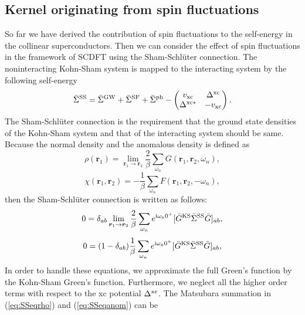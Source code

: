 \subsection{Kernel originating from spin fluctuations}
So far we have derived the contribution of spin fluctuations to the self-energy in the collinear superconductors.
Then we can consider the effect of spin fluctuations in the framework of SCDFT using the Sham-Schl\"{u}ter connection\cite{Sham1983,MarquesphD}.
The noninteracting Kohn-Sham system is mapped to the interacting system by the following self-energy
%
\begin{equation}
	\bar{\Sigma}^{\rm SS} = \bar{\Sigma}^{\rm GW} + \bar{\Sigma}^{\rm SF} + \bar{\Sigma}^{\rm ph}
	- 
	\begin{pmatrix}
		v_{\rm xc}  &   \Delta^{\rm xc}   \\
		\Delta^{\rm xc\ast}  &  -v_{\rm xc}
	\end{pmatrix}.
	\label{eq:SSself-energy}
\end{equation}
The Sham-Schl\"{u}ter connection is the requirement that the ground state densities of the Kohn-Sham
system and that of the interacting system should be same.
Because the normal density and the anomalous density is defined as 
%
\begin{equation}
	\rho(\bm r_1) = \lim_{\bm r_1 \to \bm r_2}
	\frac{2}{\beta}\sum_{\omega_n}G(\bm r_1,\bm r_2,\omega_n),
	\label{eq:normaldensity}
\end{equation}
%
\begin{equation}
	\chi(\bm r_1, \bm r_2) = - \frac{1}{\beta}\sum_{\omega_n}F(\bm r_1, \bm r_2, -\omega_n),
	\label{eq:anomdensity}
\end{equation}
%
then the Sham-Schl\"{u}ter connection is written as follows:
%
\begin{equation}
	0 = \delta_{ab}\lim_{\bm r_1 \to \bm r_2} \frac{2}{\beta} 
	\sum_{\omega_n}e^{\rm i\omega_n0^{+}}[\bar{G}^{\rm KS}\bar{\Sigma}^{\rm SS}\bar{G}]_{ab},
	\label{eq:SSeqrho}
\end{equation}
%
\begin{equation}
	0 = (1-\delta_{ab})\frac{1}{\beta}\sum_{\omega_n}
	e^{\rm i\omega_n0^{+}}[\bar{G}^{\rm KS}\bar{\Sigma}^{\rm SS}\bar{G}]_{ab},
	\label{eq:SSeqanom}
\end{equation}
%
In order to handle these equations, we approximate the full Green's function by the Kohn-Sham
Green's function. Furthermore, we neglect all the higher order terms with respect to the xc potential
$\Delta^{\rm xc}$. The Matsubara summation in (\ref{eq:SSeqrho}) and (\ref{eq:SSeqanom}) can be
